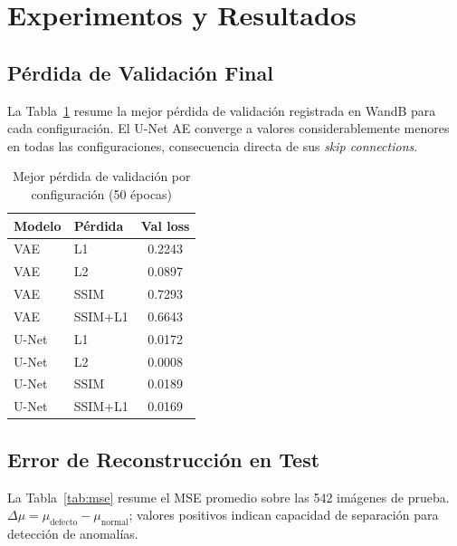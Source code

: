 \documentclass[conference]{IEEEtran}
\begin{document}
\section{Experimentos y Resultados}

\subsection{P\'erdida de Validaci\'on Final}

La Tabla~\ref{tab:valloss} resume la mejor p\'erdida de validaci\'on
registrada en WandB para cada configuraci\'on.
El U-Net AE converge a valores considerablemente menores en todas las
configuraciones, consecuencia directa de sus \textit{skip connections}.

\begin{table}[H]
\caption{Mejor p\'erdida de validaci\'on por configuraci\'on (50 \'epocas)}
\label{tab:valloss}
\centering
\begin{tabular}{llc}
\toprule
\textbf{Modelo} & \textbf{P\'erdida} & \textbf{Val loss} \\
\midrule
VAE   & L1      & 0.2243 \\
VAE   & L2      & 0.0897 \\
VAE   & SSIM    & 0.7293 \\
VAE   & SSIM+L1 & 0.6643 \\
\midrule
U-Net & L1      & 0.0172 \\
U-Net & L2      & 0.0008 \\
U-Net & SSIM    & 0.0189 \\
U-Net & SSIM+L1 & 0.0169 \\
\bottomrule
\end{tabular}
\end{table}

\subsection{Error de Reconstrucci\'on en Test}

La Tabla~\ref{tab:mse} resume el MSE promedio sobre las 542 im\'agenes
de prueba.
$\Delta\mu = \mu_{\text{defecto}} - \mu_{\text{normal}}$; valores positivos
indican capacidad de separaci\'on para detecci\'on de anomal\'ias.
\end{document}
